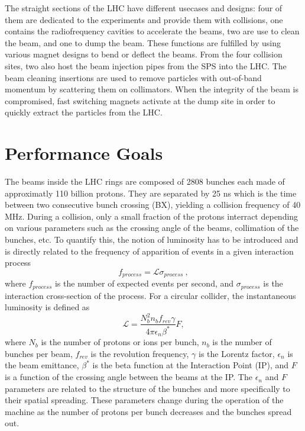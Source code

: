     The straight sections of the LHC have different usecases and designs: four of them are dedicated to the experiments and provide them with collisions, one contains the radiofrequency cavities to accelerate the beams, two are use to clean the beam, and one to dump the beam. These functions are fulfilled by using various magnet designs to bend or deflect the beams. From the four collision sites, two also host the beam injection pipes from the SPS into the LHC. The beam cleaning insertions are used to remove particles with out-of-band momentum by scattering them on collimators. When the integrity of the beam is compromised, fast switching magnets activate at the dump site in order to quickly extract the particles from the LHC. 

	\section{Performance Goals}

  	The beams inside the LHC rings are composed of 2808 bunches each made of approximatly 110 billion protons. They are separated by 25 ns which is the time between two consecutive bunch crossing (BX), yielding a collision frequency of 40 MHz. During a collision, only a small fraction of the protons interract depending on various parameters such as the crossing angle of the beams, collimation of the bunches, etc. To quantify this, the notion of luminosity has to be introduced and is directly related to the frequency of apparition of events in a given interaction process
  	\begin{equation}
  		f_{process} = \mathcal{L} \sigma_{process} \ ,
  	\end{equation}
  	where $ f_{process} $ is the number of expected events per second, and $ \sigma_{process} $ is the interaction cross-section of the process. For a circular collider, the instantaneous luminosity is defined as
  	\begin{equation}
  		\mathcal{L} = \frac{N^2_b n_b f_{rev} \gamma}{4 \pi \epsilon_n \beta^*} F ,
  	\end{equation}
  	where $ N_b $ is the number of protons or ions per bunch, $ n_b $ is the number of bunches per beam, $ f_{rev} $ is the revolution frequency, $ \gamma $ is the Lorentz factor, $ \epsilon_n $ is the beam emittance, $ \beta^* $ is the beta function at the Interaction Point (IP), and $ F $ is a function of the crossing angle between the beams at the IP. The $ \epsilon_n $ and $ F $ parameters are related to the structure of the bunches and more specifically to their spatial spreading. These parameters change during the operation of the machine as the number of protons per bunch decreases and the bunches spread out. \\

